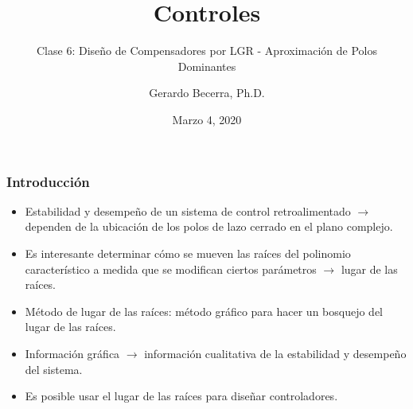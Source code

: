 \documentclass[aspectratio=169,handout]{beamer}
\title{Controles}
\subtitle{\small Clase 6: Diseño de Compensadores por LGR - Aproximación de Polos Dominantes}
\author{Gerardo Becerra, Ph.D.}
\institute{Pontificia Universidad Javeriana\\ Departamento de Electrónica}
\date{Marzo 4, 2020}
\theoremstyle{definition}
\theoremstyle{plain}
\theoremstyle{remark}
\begin{document}
\frame{\titlepage}	

\begin{frame}[<+->]\frametitle{Introducción}
\vspace*{5mm}
\centering
\begin{itemize}
	\item Estabilidad y desempeño de un sistema de control retroalimentado $\rightarrow$ dependen de la ubicación de los polos de lazo cerrado en el plano complejo.
	\item Es interesante determinar cómo se mueven las raíces del polinomio característico a medida que se modifican ciertos parámetros $\rightarrow$ lugar de las raíces.
	\item Método de lugar de las raíces: método gráfico para hacer un bosquejo del lugar de las raíces.
	\item Información gráfica $\rightarrow$ información cualitativa de la estabilidad y desempeño del sistema.
	\item Es posible usar el lugar de las raíces para diseñar controladores.
\end{itemize}
\end{frame}
\end{document}
